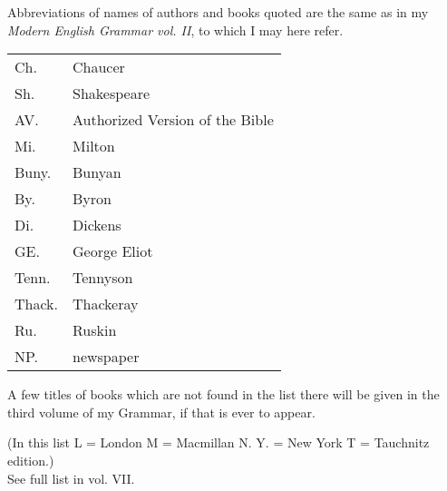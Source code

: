 
Abbreviations of names of authors and books quoted are the same as in my \textit{Modern English Grammar vol. II}, to which I may here refer. 

\phantom{a}

\begin{tabular}{ll}
Ch. & Chaucer\\
Sh. & Shakespeare\\
AV. & Authorized Version of the Bible\\
Mi. & Milton\\
Buny. & Bunyan\\
By. & Byron\\
Di. & Dickens\\
GE. & George Eliot\\
Tenn. & Tennyson\\
Thack. & Thackeray\\
Ru. & Ruskin\\
NP. & newspaper
\end{tabular}

\phantom{a}

\noindent A few titles of books which are not found in the list there will be given in the third volume of
my Grammar, if that is ever to appear.


(In this list L = London M = Macmillan N. Y. = New York T = Tauchnitz edition.) \\
See full list in vol. VII.

